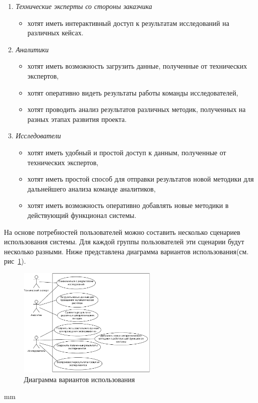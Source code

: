 \begin{enumerate}
    \item {
        \textit{Технические эксперты со стороны заказчика}
        \begin{itemize}
            \item хотят иметь интерактивный доступ к результатам исследований на различных кейсах.
        \end{itemize}
    }
    \item {
        \textit{Аналитики}
        \begin{itemize}
            \item хотят иметь возможность загрузить данные, полученные от технических экспертов,
            \item хотят оперативно видеть результаты работы команды исследователей,
            \item хотят проводить анализ результатов различных методик, полученных на разных этапах развития проекта.
        \end{itemize}
    }
    \item {
        \textit{Исследователи}
        \begin{itemize}
            \item хотят иметь удобный и простой доступ к данным, полученные от технических экспертов,
            \item хотят иметь простой способ для отправки результатов новой методики для дальнейшего анализа команде аналитиков,
            \item хотят иметь возможность оперативно добавлять новые методики в действующий функционал системы.
        \end{itemize}
    }
\end{enumerate}

На основе потребностей пользователей можно составить несколько сценариев использования системы.
Для каждой группы пользователей эти сценарии будут несколько разными.
Ниже представлена диаграмма вариантов использования(см. рис\ \ref{pic:analysis__usecases-usecase}).

\begin{figure}[H]
	\hspace*{-2.5 cm}\includegraphics[width=0.6\textwidth, left]{analysis/pictures/usecases/usecase}
	\caption{Диаграмма вариантов использования}
	\label{pic:analysis__usecases-usecase}
\end{figure}
 mm

